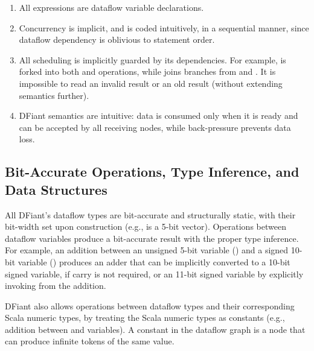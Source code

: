 \begin{enumerate}
  \item All expressions are dataflow variable declarations.
  \item Concurrency is implicit, and  is coded intuitively, in a sequential manner, since dataflow dependency is oblivious to statement order. 
  \item All scheduling is implicitly guarded by its dependencies. For example,  is forked into both  and  operations, while  joins branches from  and .
  It is impossible to read an invalid result or an old result (without extending semantics further).
  \item DFiant semantics are intuitive: data is consumed only when it is ready and can be accepted by all receiving nodes, while back-pressure prevents data loss. 
\end{enumerate} 



\subsection{Bit-Accurate Operations, Type Inference, and Data Structures}
All DFiant's dataflow types are bit-accurate and structurally static, with their bit-width set upon construction (e.g.,  is a 5-bit vector). Operations between dataflow variables produce a bit-accurate result with the proper type inference. For example, an addition between an unsigned 5-bit variable () and a signed 10-bit variable () produces an adder that can be implicitly converted to a 10-bit signed variable, if carry is not required, or an 11-bit signed variable by explicitly invoking  from the addition.

DFiant also allows operations between dataflow types and their corresponding Scala numeric types, by treating the Scala numeric types as constants (e.g., addition between  and  variables). A constant in the dataflow graph is a node that can produce infinite tokens of the same value.   

